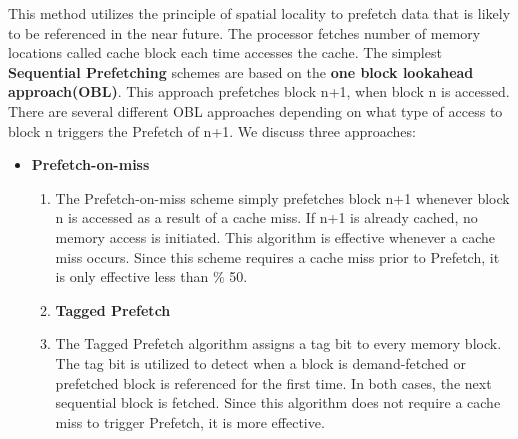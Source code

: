 \documentclass[12pt]{article}
\begin{document}
\vspace{\baselineskip}
{\fontsize{15pt}{18.0pt}\selectfont \textcolor[HTML]{222222}{This method utilizes the principle of spatial locality to prefetch data that is likely to be referenced in the near future. The processor fetches number of memory locations called cache block each time accesses the cache. The simplest \textbf{Sequential Prefetching} schemes are based on the \textbf{one block lookahead approach(OBL)}. This approach prefetches block n+1, when block n is accessed. There are several different OBL approaches depending on what type of access to block n triggers the Prefetch of n+1. We discuss three approaches:}\par}\par


\vspace{\baselineskip}
\begin{itemize}
	\item {\fontsize{16pt}{19.2pt}\selectfont \textbf{\textcolor[HTML]{222222}{Prefetch-on-miss}}\par}\par

\begin{enumerate}
	\item {\fontsize{15pt}{18.0pt}\selectfont \textcolor[HTML]{222222}{The Prefetch-on-miss scheme simply prefetches block n+1 whenever block n is accessed as a result of a cache miss. If n+1 is already cached, no memory access is initiated. This algorithm is effective whenever a cache miss occurs. Since this scheme requires a cache miss prior to Prefetch, it is only effective less than $\%$ 50.}\par}\par


\vspace{\baselineskip}
	\item {\fontsize{16pt}{19.2pt}\selectfont \textbf{\textcolor[HTML]{222222}{Tagged Prefetch}}\par}\par

	\item {\fontsize{15pt}{18.0pt}\selectfont \textcolor[HTML]{222222}{The Tagged Prefetch algorithm assigns a tag bit to every memory block. The tag bit is utilized to detect when a block is demand-fetched or prefetched block is referenced for the first time. In both cases, the next sequential block is fetched. Since this algorithm does not require a cache miss to trigger Prefetch, it is more effective.}\par}\par



\end{enumerate}
\end{itemize}
\end{document}
